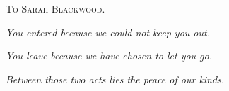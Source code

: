 \typeoutsidermanuscript

\cleardoublepage
\thispagestyle{empty}
\markboth{}{}%
\vspace*{2.2in}
\begin{center}
{\scshape To Sarah Blackwood.}\par
\vspace{1.5em}
{\itshape You entered because we could not keep you out.}\par
\vspace{0.35em}
{\itshape You leave because we have chosen to let you go.}\par
\vspace{0.35em}
{\itshape Between those two acts lies the peace of our kinds.}\par
\end{center}
\vfill
